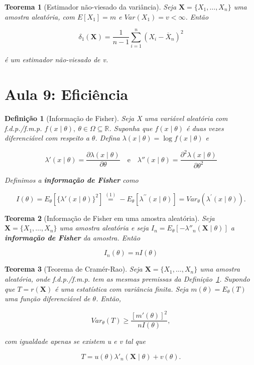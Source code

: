 \documentclass{article}
\newtheorem{theorem}{Teorema}
\newtheorem{definition}{Definição}
\begin{document}
\begin{theorem}[Estimador não-viesado da variância]
Seja $\textbf{X} = \{ X_1, \ldots, X_n \}$ uma amostra aleatória, com $E[X_1] = m$ e $Var(X_1) = v < \infty$. Então

$$\delta_1(\textbf{X}) = \frac{1}{n - 1}\sum_{i = 1}^n (X_i - \overline{X}_n)^2$$

é um estimador não-viesado de v.
\end{theorem}

\section*{Aula 9: Eficiência}
\label{s9}
\begin{definition}[Informação de Fisher]\label{def:fis}
Seja X uma variável aleatória com f.d.p./f.m.p. $f(x \mid \theta), \ \theta \in \Omega \subseteq \mathbb{R}$. Suponha que $f(x \mid \theta)$ é duas vezes diferenciável com respeito a $\theta$. Defina $\lambda (x \mid \theta) = \log f(x \mid \theta)$ e

\begin{equation}
    \lambda' (x \mid \theta) = \frac{\partial \lambda (x \mid \theta)}{\partial \theta} \quad \mathrm{e} \quad \lambda'' (x \mid \theta) = \frac{\partial^2 \lambda(x \mid \theta)}{\partial \theta^2}
\end{equation}

Definimos a \textbf{informação de Fisher} como

\begin{equation}
    I(\theta) = E_\theta \left [ \{ \lambda'(x \mid \theta) \}^2 \right ] \stackrel{\mathrm{(1)}}{=} -E_\theta\left[\lambda^{\prime\prime}(x \mid \theta)\right] = Var_\theta\left(\lambda^{\prime}(x\mid \theta) \right).
\end{equation}
\end{definition}

\begin{theorem}[Informação de Fisher em uma amostra aleatória]
Seja $\textbf{X} = \{ X_1, \ldots, X_n \}$ uma amostra aleatória e seja $I_n = E_\theta [- \lambda''_n (\textbf{X} \mid \theta)]$ a \textbf{informação de Fisher} da amostra. Então

$$I_n(\theta) = n I(\theta)$$
\end{theorem}

\begin{theorem}[Teorema de Cramér-Rao]
Seja $\textbf{X} = \{ X_1, \ldots, X_n \}$ uma amostra aleatória, onde f.d.p./f.m.p. tem as mesmas premissas da Definição~\ref{def:fis}. Supondo que $T = r(\textbf{X})$ é uma estatística com variância finita. Seja $m(\theta) = E_\theta(T)$ uma função diferenciável de $\theta$. Então,

\begin{equation}
    Var_\theta(T) \geq \frac{[m'(\theta)]^2}{n I(\theta)},
\end{equation}

com igualdade apenas se existem u e v tal que

$$T = u(\theta) \lambda'_n (\textbf{X} \mid \theta) + v(\theta).$$
\end{theorem}
\end{document}
